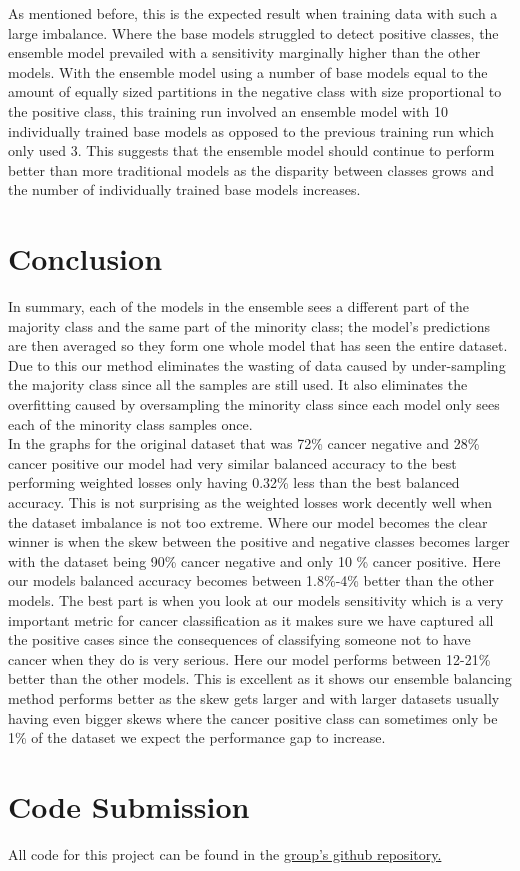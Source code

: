 \documentclass[conference]{IEEEtran}
\begin{document}
As mentioned before, this is the expected result when training data with such a
large imbalance.  Where the base models struggled to detect positive classes,
the ensemble model prevailed with a sensitivity marginally higher than the
other models.  With the ensemble model using a number of base models equal to
the amount of equally sized partitions in the negative class with size
proportional to the positive class, this training run involved an ensemble
model with 10 individually trained base models as opposed to the previous
training run which only used 3.  This suggests that the ensemble model should
continue to perform better than more traditional models as the disparity
between classes grows and the number of individually trained base models
increases.


\section{Conclusion}
In summary, each of the models in the ensemble sees a different part of the
majority class and the same part of the minority class; the model’s predictions
are then averaged so they form one whole model that has seen the entire
dataset. Due to this our method eliminates the wasting of data caused by
under-sampling the majority class since all the samples are still used. It also
eliminates the overfitting caused by oversampling the minority class since each
model only sees each of the minority class samples once.
\\ \indent In the graphs for the original dataset that was 72\% cancer negative
and 28\% cancer positive our model had very similar balanced accuracy to the
best performing weighted losses only having 0.32\% less than the best balanced
accuracy. This is not surprising as the weighted losses work decently well when
the dataset imbalance is not too extreme. Where our model becomes the clear
winner is when the skew between the positive and negative classes becomes
larger with the dataset being 90\% cancer negative and only 10 \% cancer
positive. Here our models balanced accuracy becomes between 1.8\%-4\% better than
the other models. The best part is when you look at our models sensitivity
which is a very important metric for cancer classification as it makes sure we
have captured all the positive cases since the consequences of classifying
someone not to have cancer when they do is very serious. Here our model
performs between 12-21\% better than the other models. This is excellent as it
shows our ensemble balancing method performs better as the skew gets larger and
with larger datasets usually having even bigger skews where the cancer positive
class can sometimes only be 1\% of the dataset we expect the performance gap to
increase.




\section{Code Submission}
All code for this project can be found in the
\underline{
\href{https://github.com/svecile/Breast-Histopathology-Classification}
  {group's github repository}.}
\end{document}
